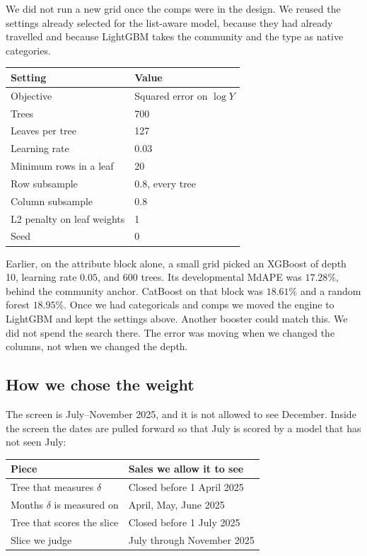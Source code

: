 \documentclass[11pt]{article}
\begin{document}
We did not run a new grid once the comps were in the design. We reused the settings already selected for the list-aware model, because they had already travelled and because LightGBM takes the community and the type as native categories.

\begin{center}
\begin{tabular}{ll}
\toprule
Setting & Value \\
\midrule
Objective & Squared error on \(\log Y\) \\
Trees & 700 \\
Leaves per tree & 127 \\
Learning rate & 0.03 \\
Minimum rows in a leaf & 20 \\
Row subsample & 0.8, every tree \\
Column subsample & 0.8 \\
L2 penalty on leaf weights & 1 \\
Seed & 0 \\
\bottomrule
\end{tabular}
\end{center}

Earlier, on the attribute block alone, a small grid picked an XGBoost of depth 10, learning rate \(0.05\), and 600 trees. Its developmental MdAPE was \(17.28\%\), behind the community anchor. CatBoost on that block was \(18.61\%\) and a random forest \(18.95\%\). Once we had categoricals and comps we moved the engine to LightGBM and kept the settings above. Another booster could match this. We did not spend the search there. The error was moving when we changed the columns, not when we changed the depth.

\subsection{How we chose the weight}

The screen is July--November 2025, and it is not allowed to see December. Inside the screen the dates are pulled forward so that July is scored by a model that has not seen July:

\begin{center}
\small
\begin{tabular}{ll}
\toprule
Piece & Sales we allow it to see \\
\midrule
Tree that measures \(\delta\) & Closed before 1 April 2025 \\
Months \(\delta\) is measured on & April, May, June 2025 \\
Tree that scores the slice & Closed before 1 July 2025 \\
Slice we judge & July through November 2025 \\
\bottomrule
\end{tabular}
\end{center}
\end{document}
